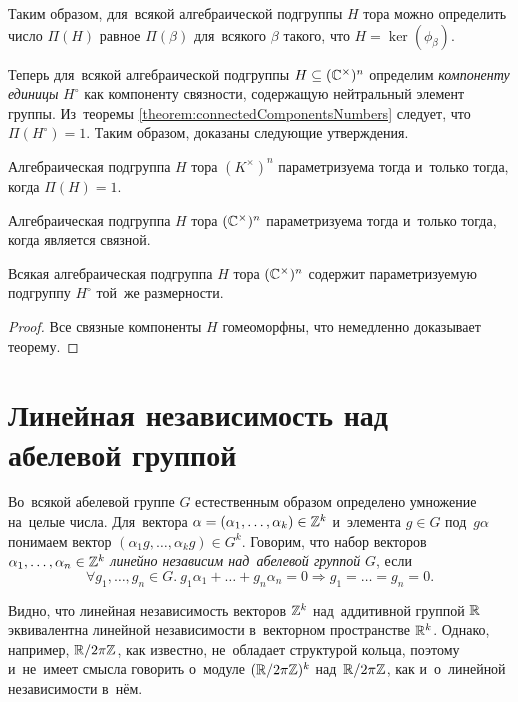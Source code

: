 \documentclass[a4paper,oneside]{article}
\begin{document}
Таким образом, для~всякой алгебраической подгруппы $H$ тора можно определить число $\Pi(H)$
равное $\Pi(\beta)$ для~всякого $\beta$ такого, что $H = \ker(\phi_\beta)$.

Теперь для~всякой алгебраической подгруппы $H \subseteq (\mathbb{C}^\times)^n$ определим \textit{компоненту единицы} $H^\circ$
как компоненту связности, содержащую нейтральный элемент группы. Из~теоремы \ref{theorem:connectedComponentsNumbers} следует,
что $\Pi(H^\circ) = 1$. Таким образом, доказаны следующие утверждения.

\begin{theorem}
\label{theorem:ExistenceCondition}
  Алгебраическая подгруппа $H$ тора $(K^\times)^n$ параметризуема тогда и~только тогда, когда $\Pi(H) = 1$.
\end{theorem}

\begin{consequence}
\label{consequence:ExistenceCondition}
  Алгебраическая подгруппа $H$ тора $(\mathbb{C}^\times)^n$ параметризуема тогда и~только тогда, когда является связной.
\end{consequence}

\begin{consequence}
  Всякая алгебраическая подгруппа $H$ тора $(\mathbb{C}^\times)^n$ содержит параметризуемую подгруппу $H^\circ$ той~же размерности.
\end{consequence}

\begin{proof}
  Все связные компоненты $H$ гомеоморфны, что немедленно доказывает теорему.
\end{proof}

\section{Линейная независимость над абелевой группой}
Во~всякой абелевой группе $G$ естественным образом определено умножение на~целые числа.
Для~вектора $\alpha = (\alpha_1, \ldots, \alpha_k) \in \mathbb{Z}^k$ и~элемента $g \in G$
под~$g \alpha$ понимаем вектор $(\alpha_1 g, \ldots, \alpha_k g) \in G^k$.
Говорим, что набор векторов $\alpha_1, \ldots, \alpha_n \in \mathbb{Z}^k$ \textit{линейно независим над~абелевой группой} $G$, если
\[
  \forall g_1, \ldots, g_n \in G.\ g_1 \alpha_1 + \ldots + g_n \alpha_n = 0 \Rightarrow g_1 = \ldots = g_n = 0.
\]

Видно, что линейная независимость векторов $\mathbb{Z}^k$ над~аддитивной группой $\mathbb{R}$ эквивалентна линейной независимости
в~векторном пространстве $\mathbb{R}^k$. Однако, например, $\mathbb{R} / 2 \pi \mathbb{Z}$, как известно, не~обладает структурой кольца,
поэтому и~не~имеет смысла говорить о~модуле $(\mathbb{R} / 2 \pi \mathbb{Z})^k$ над~$\mathbb{R} / 2 \pi \mathbb{Z}$, как и~о~линейной независимости
в~нём.
\end{document}
